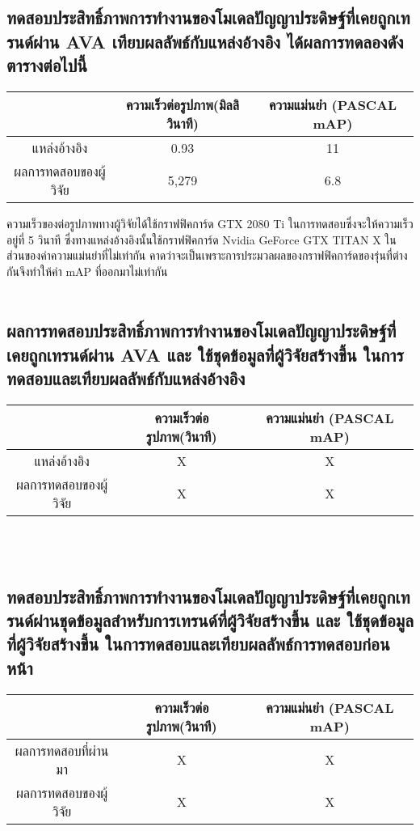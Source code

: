 \subsection{ทดสอบประสิทธิ์ภาพการทำงานของโมเดลปัญญาประดิษฐ์ที่เคยถูกเทรนด์ผ่าน AVA เทียบผลลัพธ์กับแหล่งอ้างอิง ได้ผลการทดลองดังตารางต่อไปนี้}
\begin{tabular}{|c|c|c|}
		\hline
		{}&{ความเร็วต่อรูปภาพ(มิลลิวินาที)}&{ความแม่นยำ (PASCAL mAP)}			\\
		\hline
		แหล่งอ้างอิง	 					& 0.93		& 11														\\
		ผลการทดสอบของผู้วิจัย				& 5,279  		& 6.8				\\
		\hline
\end{tabular}
ความเร็วของต่อรูปภาพทางผู้วิจัยได้ใช้กราฟฟิคการ์ด GTX 2080 Ti ในการทดสอบซึ่งจะให้ความเร็วอยู่ที่ 5 วินาที ซึ่งทางแหล่งอ้างอิงนั้นใช้กราฟฟิคการ์ด Nvidia GeForce GTX TITAN X ในส่วนของค่าความแม่นยำที่ไม่เท่ากัน คาดว่าจะเป็นเพราะการประมวลผลของกราฟฟิคการ์ดของรุ่นที่ต่างกันจึงทำให้ค่า mAP ที่ออกมาไม่เท่ากัน
\\\\
\subsection{ผลการทดสอบประสิทธิ์ภาพการทำงานของโมเดลปัญญาประดิษฐ์ที่เคยถูกเทรนด์ผ่าน AVA และ ใช้ชุดข้อมูลที่ผู้วิจัยสร้างขึ้น ในการทดสอบและเทียบผลลัพธ์กับแหล่งอ้างอิง}
\begin{tabular}{|c|c|c|}
		\hline
		{}&{ความเร็วต่อรูปภาพ(วินาที)}&{ความแม่นยำ (PASCAL mAP)}			\\
		\hline
		แหล่งอ้างอิง	 					& X			& X														\\
		ผลการทดสอบของผู้วิจัย				& X			& X				\\
		\hline
\end{tabular}
\\\\
\subsection{ทดสอบประสิทธิ์ภาพการทำงานของโมเดลปัญญาประดิษฐ์ที่เคยถูกเทรนด์ผ่านชุดข้อมูลสำหรับการเทรนด์ที่ผู้วิจัยสร้างขึ้น และ ใช้ชุดข้อมูลที่ผู้วิจัยสร้างขึ้น ในการทดสอบและเทียบผลลัพธ์การทดสอบก่อนหน้า}
\begin{tabular}{|c|c|c|}
		\hline
		{}&{ความเร็วต่อรูปภาพ(วินาที)}&{ความแม่นยำ (PASCAL mAP)}			\\
		\hline
		ผลการทดสอบที่ผ่านมา	 				& X			& X					\\
		ผลการทดสอบของผู้วิจัย				& X			& X				\\
		\hline
\end{tabular}

